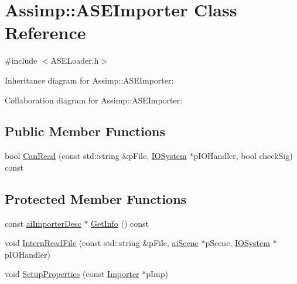 \hypertarget{class_assimp_1_1_a_s_e_importer}{\section{Assimp\+:\+:A\+S\+E\+Importer Class Reference}
\label{class_assimp_1_1_a_s_e_importer}
}


{\ttfamily \#include $<$A\+S\+E\+Loader.\+h$>$}



Inheritance diagram for Assimp\+:\+:A\+S\+E\+Importer\+:


Collaboration diagram for Assimp\+:\+:A\+S\+E\+Importer\+:
\subsection*{Public Member Functions}
\begin{DoxyCompactItemize}
\item 
bool \hyperlink{class_assimp_1_1_a_s_e_importer_ae47165bcc544db0a849f024c0ae8f07b}{Can\+Read} (const std\+::string \&p\+File, \hyperlink{class_assimp_1_1_i_o_system}{I\+O\+System} $\ast$p\+I\+O\+Handler, bool check\+Sig) const 
\end{DoxyCompactItemize}
\subsection*{Protected Member Functions}
\begin{DoxyCompactItemize}
\item 
const \hyperlink{structai_importer_desc}{ai\+Importer\+Desc} $\ast$ \hyperlink{class_assimp_1_1_a_s_e_importer_a3b24264bef094b708ff100f35b59f079}{Get\+Info} () const 
\item 
void \hyperlink{class_assimp_1_1_a_s_e_importer_a9e7b1964d1476cfaf6f45e3ce37b2a78}{Intern\+Read\+File} (const std\+::string \&p\+File, \hyperlink{structai_scene}{ai\+Scene} $\ast$p\+Scene, \hyperlink{class_assimp_1_1_i_o_system}{I\+O\+System} $\ast$p\+I\+O\+Handler)
\item 
void \hyperlink{class_assimp_1_1_a_s_e_importer_a71d33277500d8b4c300e2b36eb94d472}{Setup\+Properties} (const \hyperlink{class_assimp_1_1_importer}{Importer} $\ast$p\+Imp)
\end{DoxyCompactItemize}
